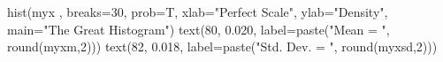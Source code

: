 \begin{Schunk}
\begin{Sinput}
 hist(myx , breaks=30, prob=T, xlab="Perfect Scale", ylab="Density", main="The Great Histogram")
 text(80, 0.020, label=paste("Mean = ", round(myxm,2)))
 text(82, 0.018, label=paste("Std. Dev. = ", round(myxsd,2)))
\end{Sinput}
\end{Schunk}
